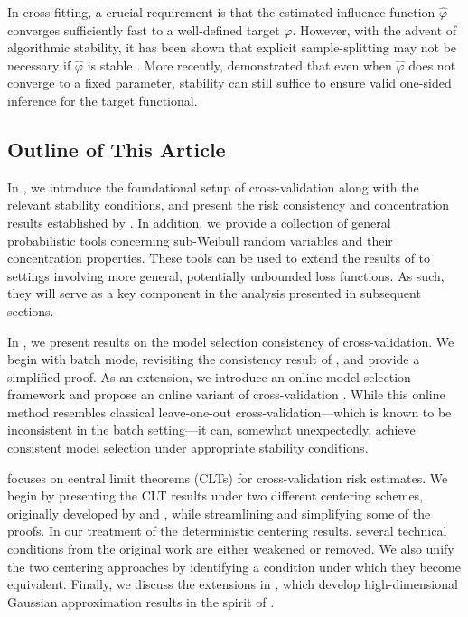 \documentclass[11pt]{article}
\theoremstyle{plain}
\begin{document}
In cross-fitting, a crucial requirement is that the estimated influence function $\hat\varphi$ converges sufficiently fast to a well-defined target $\varphi$. However, with the advent of algorithmic stability, it has been shown that explicit sample-splitting may not be necessary if $\hat\varphi$ is stable \citep{chen2022debiased}. More recently, \cite{zhang2024winners} demonstrated that even when $\hat\varphi$ does not converge to a fixed parameter, stability can still suffice to ensure valid one-sided inference for the target functional.

\subsection{Outline of This Article}
In , we introduce the foundational setup of cross-validation along with the relevant stability conditions, and present the risk consistency and concentration results established by \cite{bousquet2002stability}. In addition, we provide a collection of general probabilistic tools concerning sub-Weibull random variables and their concentration properties. These tools can be used to extend the results of \cite{bousquet2002stability} to settings involving more general, potentially unbounded loss functions. As such, they will serve as a key component in the analysis presented in subsequent sections.

In , we present results on the model selection consistency of cross-validation. We begin with batch mode, revisiting the consistency result of \cite{yang2007consistency}, and provide a simplified proof.  As an extension, we introduce an online model selection framework and propose an online variant of cross-validation \citep{zhang2023online}. While this online method resembles classical leave-one-out cross-validation---which is known to be inconsistent in the batch setting---it can, somewhat unexpectedly, achieve consistent model selection under appropriate stability conditions.

 focuses on central limit theorems (CLTs) for cross-validation risk estimates. We begin by presenting the CLT results under two different centering schemes, originally developed by \cite{bayle2020cross} and \cite{austern2020}, while streamlining and simplifying some of the proofs. In our treatment of the deterministic centering results, several technical conditions from the original work are either weakened or removed. We also unify the two centering approaches by identifying a condition under which they become equivalent. Finally, we discuss the extensions in \cite{kissel2022high}, which develop high-dimensional Gaussian approximation results in the spirit of \cite{chernozhukov2013gaussian,chernozhukov2022improved}.
\end{document}
